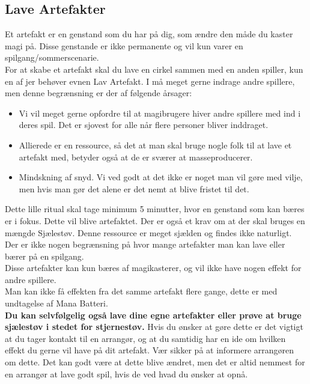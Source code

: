 \subsection*{Lave Artefakter}

Et artefakt er en genstand som du har på dig, som ændre den måde du kaster magi på. Disse genstande er ikke permanente og vil kun varer en spilgang/sommerscenarie. \\
For at skabe et artefakt skal du lave en cirkel sammen med en anden spiller, kun en af jer behøver evnen Lav Artefakt. I må meget gerne indrage andre spillere, men denne begrænsning er der af følgende årsager:\\
\begin{itemize}
    \item Vi vil meget gerne opfordre  til at magibrugere hiver andre spillere med ind i deres spil. Det er sjovest for alle når flere personer bliver inddraget.
    \item Allierede er en ressource, så det at man skal bruge nogle folk til at lave et artefakt med, betyder også at de er sværer at masseproducerer.
    \item Mindskning af snyd. Vi ved godt at det ikke er noget man vil gøre med vilje, men hvis man gør det alene er det nemt at blive fristet til det.
\end{itemize}
Dette lille ritual skal tage minimum 5 minutter, hvor en genstand som kan bæres er i fokus. Dette vil blive artefaktet. Der er også et krav om at der skal bruges en mængde Sjælestøv. Denne ressource er meget sjælden og findes ikke naturligt. Der er ikke nogen begrænsning på hvor mange artefakter man kan lave eller bærer på en spilgang.\\ 
Disse artefakter kan kun bæres af magikasterer, og vil ikke have nogen effekt for andre spillere.\\
Man kan ikke få effekten fra det samme artefakt flere gange, dette er med undtagelse af Mana Batteri.\\ 

\textbf{Du kan selvfølgelig også lave dine egne artefakter eller prøve at bruge sjælestøv i stedet for stjernestøv.} Hvis du ønsker at gøre dette er det vigtigt at du tager kontakt til en arrangør, og at du samtidig har en ide om hvilken effekt du gerne vil have på dit artefakt. Vær sikker på at informere arrangøren om dette. Det kan godt være at dette blive ændret, men det er altid nemmest for en arrangør at lave godt spil, hvis de ved hvad du ønsker at opnå.

